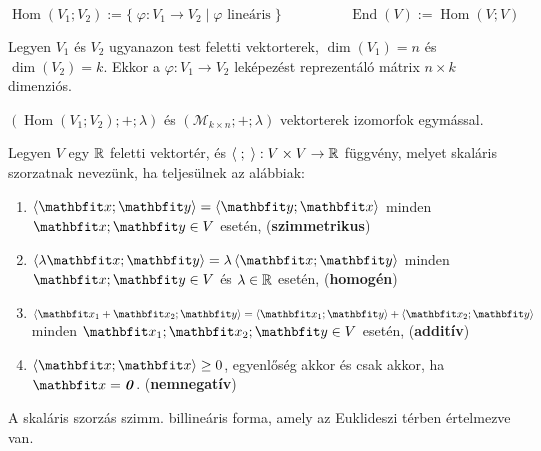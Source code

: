 \begin{definition}
  \vspace{-1.5em}
  $$
    \operatorname{Hom} (V_1; V_2) := \big\{\;
    \varphi: V_1 \to V_2 \; \big| \; \varphi \text{ lineáris}
    \;\big\}
    \hspace{2cm}
    \operatorname{End} (V) := \operatorname{Hom} (V; V)
  $$
\end{definition}

\begin{note}
  Legyen $V_1$ és $V_2$ ugyanazon test feletti vektorterek, $\dim(V_1) = n$ és
  $\dim(V_2) = k$. Ekkor a $\varphi: V_1 \rightarrow V_2$ leképezést
  reprezentáló mátrix $n \times k$ dimenziós.

  $\left( \operatorname{Hom}(V_1; V_2); +; \lambda\right)$ és
  $\left( \mathcal{M}_{k \times n}; +; \lambda\right)$
  vektorterek izomorfok egymással.
\end{note}

\begin{minipage}{\textwidth}
  \begin{definition}
    Legyen $V$ egy $\mathbb{R}$ feletti vektortér, és
    $\left\langle\;;\;\right\rangle: V \times V \rightarrow \mathbb{R}$ függvény,
    melyet skaláris szorzatnak nevezünk, ha teljesülnek az alábbiak:
    \begin{enumerate}
      \item $\scalar{\rvec x}{\rvec y} = \scalar{\rvec y}{\rvec x}$
            minden $\rvec x; \rvec y \in V$ esetén,
            \hfill (\textbf{szimmetrikus})

      \item $\scalar{\lambda \rvec x}{\rvec y} = \lambda \scalar{\rvec x}{\rvec y}$
            minden $\rvec x; \rvec y \in V$ és $\lambda \in \mathbb{R}$ esetén,
            \hfill (\textbf{homogén})

      \item $\scalar{\rvec x_1 + \rvec x_2}{\rvec y} = \scalar{\rvec x_1}{\rvec y} + \scalar{\rvec x_2}{\rvec y}$
            minden $\rvec x_1; \rvec x_2; \rvec y \in V$ esetén,
            \hfill (\textbf{additív})

      \item $\scalar{\rvec x}{\rvec x} \geq 0$,
            egyenlőség akkor és csak akkor, ha $\rvec x = \nvec$.
            \hfill (\textbf{nemnegatív})
    \end{enumerate}
  \end{definition}

  \begin{note}
    A skaláris szorzás szimm. billineáris forma, amely az Euklideszi térben
    értelmezve van.
  \end{note}
\end{minipage}